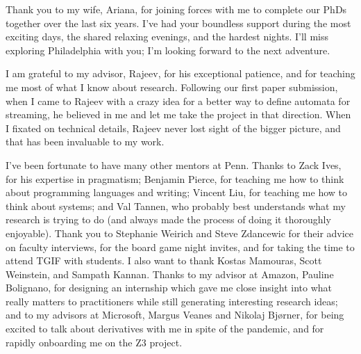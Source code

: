 Thank you to my wife, Ariana, for joining forces with me to complete our PhDs together over the last six years.
I've had your boundless support during the most exciting days, the shared relaxing evenings, and the hardest nights.
I'll miss exploring Philadelphia with you; I'm looking forward to the next adventure.

I am grateful to my advisor, Rajeev, for his exceptional patience, and for teaching me most of what I know about research.
Following our first paper submission, when I came to Rajeev with a crazy idea for a better way to define automata for streaming, he believed in me and let me take the project in that direction.
When I fixated on technical details, Rajeev never lost sight of the bigger picture, and that has been invaluable to my work.

I've been fortunate to have many other mentors at Penn. Thanks to Zack Ives, for his expertise in pragmatism; Benjamin Pierce, for teaching me how to think about programming languages and writing; Vincent Liu, for teaching me how to think about systems; and Val Tannen, who probably best understands what my research is trying to do (and always made the process of doing it thoroughly enjoyable).
Thank you to Stephanie Weirich and Steve Zdancewic for their advice on faculty interviews, for the board game night invites, and for taking the time to attend TGIF with students.
I also want to thank Kostas Mamouras, Scott Weinstein, and Sampath Kannan.
Thanks to my advisor at Amazon, Pauline Bolignano, for designing an internship which gave me close insight into what really matters to practitioners while still generating interesting research ideas; and to my advisors at Microsoft, Margus Veanes and Nikolaj Bjørner,
for being excited to talk about derivatives with me in spite of the pandemic, and for rapidly onboarding me on the Z3 project.

